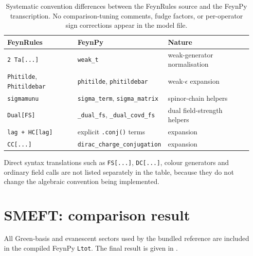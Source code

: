 \begin{table}[htbp]
\centering
\begin{tabular}{lll}
\toprule
FeynRules & FeynPy & Nature \\
\midrule
\texttt{2 Ta[...]} & \texttt{weak\_t} & weak-generator normalisation \\
\texttt{Phitilde}, \texttt{Phitildebar} & \texttt{phitilde}, \texttt{phitildebar} & weak-\(\epsilon\) expansion \\
\texttt{sigmamunu} & \texttt{sigma\_term}, \texttt{sigma\_matrix} & spinor-chain helpers \\
\texttt{Dual[FS]} & \texttt{\_dual\_fs}, \texttt{\_dual\_covd\_fs} & dual field-strength helpers \\
\texttt{lag + HC[lag]} & explicit \texttt{.conj()} terms & expansion \\
\texttt{CC[...]} & \texttt{dirac\_charge\_conjugation} & expansion \\
\bottomrule
\end{tabular}
\caption{Systematic convention differences between the FeynRules source and
the FeynPy transcription. No comparison-tuning comments, fudge factors, or
per-operator sign corrections appear in the model file.}
\label{tab:validation-conventions}
\end{table}

Direct syntax translations such as \texttt{FS[...]}, \texttt{DC[...]}, colour generators and ordinary field calls are not listed separately in the table, because they do not change the algebraic convention being implemented.

\section{SMEFT: comparison result}
\label{sec:validation-smeft}

All Green-basis and evanescent sectors used by the bundled reference are
included in the compiled FeynPy \texttt{Ltot}. The final result is given in
.

